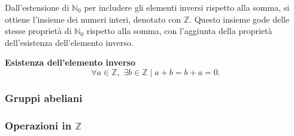 Dall'estensione di $\mathbb{N}_0$ per includere gli elementi inversi rispetto alla somma,
si ottiene l'insieme dei numeri interi, denotato con $\mathbb{Z}$. Questo insieme gode delle stesse proprietà di
$\mathbb{N}_0$ rispetto alla somma, con l'aggiunta della proprietà dell'esistenza dell'elemento inverso.

\begin{property}
    \textbf{Esistenza dell'elemento inverso}
    \[\forall a \in \mathbb{Z}, \, \, \exists b \in \mathbb{Z} \mid a + b = b + a = 0.\]
\end{property}

\subsubsection{Gruppi abeliani}



\subsubsection{Operazioni in $\mathbb{Z}$}

